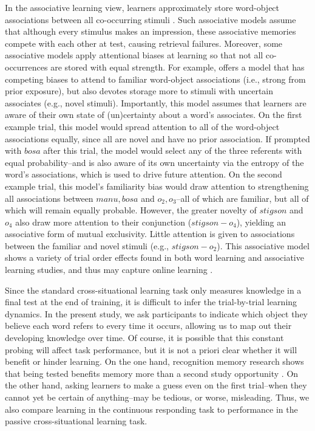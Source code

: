 \documentclass[man,floatsintext]{apa6}
\begin{document}
In the associative learning view, learners approximately store word-object associations between all co-occurring stimuli \citep{Yu:2008,Fazly:2010,Kachergis:2012vc,Kachergis:2012gi}. Such associative models assume that although every stimulus makes an impression, these associative memories compete with each other at test, causing retrieval failures. Moreover, some associative models apply attentional biases at learning so that not all co-occurrences are stored with equal strength. For example, \cite{Kachergis:2012gi} offers a model that has competing biases to attend to familiar word-object associations (i.e., strong from prior exposure), but also devotes storage more to stimuli with uncertain associates (e.g., novel stimuli). Importantly, this model assumes that learners are aware of their own state of (un)certainty about a word's associates. On the first example trial, this model would spread attention to all of the word-object associations equally, since all are novel and have no prior association. If prompted with $bosa$ after this trial, the model would select any of the three referents with equal probability--and is also aware of its own uncertainty via the entropy of the word's associations, which is used to drive future attention. On the second example trial, this model's familiarity bias would draw attention to strengthening all associations between ${manu, bosa}$ and ${o_2, o_3}$--all of which are familiar, but all of which will remain equally probable. However, the greater novelty of $stigson$ and $o_4$ also draw more attention to their conjunction ($stigson-o_4$), yielding an associative form of mutual exclusivity. Little attention is given to associations between the familiar and novel stimuli (e.g., $stigson-o_2$). This associative model shows a variety of trial order effects found in both word learning and associative learning studies, and thus may capture online learning \citep{Kachergis:2009tc,Kachergis:2012vc}.


Since the standard cross-situational learning task only measures knowledge in a final test at the end of training, it is difficult to infer the trial-by-trial learning dynamics. In the present study, we ask participants to indicate which object they believe each word refers to every time it occurs, allowing us to map out their developing knowledge over time. Of course, it is possible that this constant probing will affect task performance, but it is not a priori clear whether it will benefit or hinder learning. On the one hand, recognition memory research shows that being tested benefits memory more than a second study opportunity \citep{Carrier:1992}. On the other hand, asking learners to make a guess even on the first trial--when they cannot yet be certain of anything--may be tedious, or worse, misleading. Thus, we also compare learning in the continuous responding task to performance in the passive cross-situational learning task.
\end{document}
